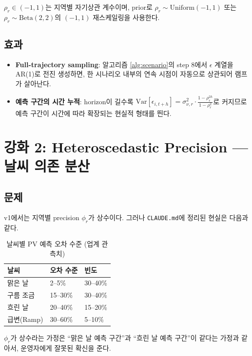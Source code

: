 \documentclass[11pt,a4paper]{article}
\begin{document}
$\rho_r\in(-1,1)$는 지역별 자기상관 계수이며, prior로 $\rho_r\sim\mathrm{Uniform}(-1,1)$ 또는 $\rho_r\sim\mathrm{Beta}(2,2)$의 $(-1,1)$ 재스케일링을 사용한다.

\subsection{효과}

\begin{itemize}[leftmargin=2em]
    \item \textbf{Full-trajectory sampling}: 알고리즘 \ref{alg:scenario}의 step 8에서 $\epsilon$ 계열을 AR(1)로 전진 생성하면, 한 시나리오 내부의 연속 시점이 자동으로 상관되어 램프가 살아난다.
    \item \textbf{예측 구간의 시간 누적}: horizon이 길수록 $\mathrm{Var}[\epsilon_{i,t+h}] = \sigma^2_{\nu,r}\cdot\frac{1-\rho_r^{2h}}{1-\rho_r^2}$로 커지므로 예측 구간이 시간에 따라 확장되는 현실적 형태를 띈다.
\end{itemize}

\section{강화 2: Heteroscedastic Precision --- 날씨 의존 분산}

\subsection{문제}

v1에서는 지역별 precision $\phi_r$가 상수이다. 그러나 \texttt{CLAUDE.md}에 정리된 현실은 다음과 같다.

\begin{table}[H]
\centering
\small
\caption{날씨별 PV 예측 오차 수준 (업계 관측치)}
\begin{tabular}{lll}
\toprule
날씨 & 오차 수준 & 빈도 \\
\midrule
맑은 날 & 2--5\% & 30--40\% \\
구름 조금 & 15--30\% & 30--40\% \\
흐린 날 & 20--40\% & 15--20\% \\
급변(Ramp) & 30--60\% & 5--10\% \\
\bottomrule
\end{tabular}
\end{table}

$\phi_r$가 상수라는 가정은 ``맑은 날 예측 구간''과 ``흐린 날 예측 구간''이 같다는 가정과 같아서, 운영자에게 잘못된 확신을 준다.
\end{document}
